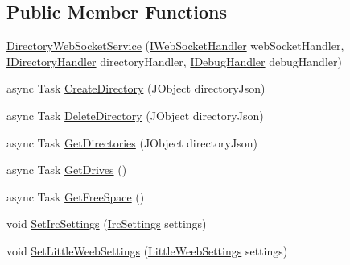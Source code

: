 \subsection*{Public Member Functions}
\begin{DoxyCompactItemize}
\item 
\mbox{\hyperlink{class_little_weeb_library_1_1_services_1_1_directory_web_socket_service_ac0842064ce4231990ed07bcbacb7a71f}{Directory\+Web\+Socket\+Service}} (\mbox{\hyperlink{interface_little_weeb_library_1_1_handlers_1_1_i_web_socket_handler}{I\+Web\+Socket\+Handler}} web\+Socket\+Handler, \mbox{\hyperlink{interface_little_weeb_library_1_1_handlers_1_1_i_directory_handler}{I\+Directory\+Handler}} directory\+Handler, \mbox{\hyperlink{interface_little_weeb_library_1_1_handlers_1_1_i_debug_handler}{I\+Debug\+Handler}} debug\+Handler)
\item 
async Task \mbox{\hyperlink{class_little_weeb_library_1_1_services_1_1_directory_web_socket_service_a3ea6566e0d21d73d331adce1ae9c7f07}{Create\+Directory}} (J\+Object directory\+Json)
\item 
async Task \mbox{\hyperlink{class_little_weeb_library_1_1_services_1_1_directory_web_socket_service_ac0af5740848de2340e4d3e9225eeb0d7}{Delete\+Directory}} (J\+Object directory\+Json)
\item 
async Task \mbox{\hyperlink{class_little_weeb_library_1_1_services_1_1_directory_web_socket_service_a1fee74b9f658b29f4c2bb643a48425e0}{Get\+Directories}} (J\+Object directory\+Json)
\item 
async Task \mbox{\hyperlink{class_little_weeb_library_1_1_services_1_1_directory_web_socket_service_a368f502e063381bccfed714d8350dc69}{Get\+Drives}} ()
\item 
async Task \mbox{\hyperlink{class_little_weeb_library_1_1_services_1_1_directory_web_socket_service_a37c3c5de12db8083e8e6d22ce1fe6776}{Get\+Free\+Space}} ()
\item 
void \mbox{\hyperlink{class_little_weeb_library_1_1_services_1_1_directory_web_socket_service_a223c62acb36e1ac602552fa1ecf67057}{Set\+Irc\+Settings}} (\mbox{\hyperlink{class_little_weeb_library_1_1_settings_1_1_irc_settings}{Irc\+Settings}} settings)
\item 
void \mbox{\hyperlink{class_little_weeb_library_1_1_services_1_1_directory_web_socket_service_a015a3ae2bb0f275de152ae039fad566e}{Set\+Little\+Weeb\+Settings}} (\mbox{\hyperlink{class_little_weeb_library_1_1_settings_1_1_little_weeb_settings}{Little\+Weeb\+Settings}} settings)
\end{DoxyCompactItemize}
